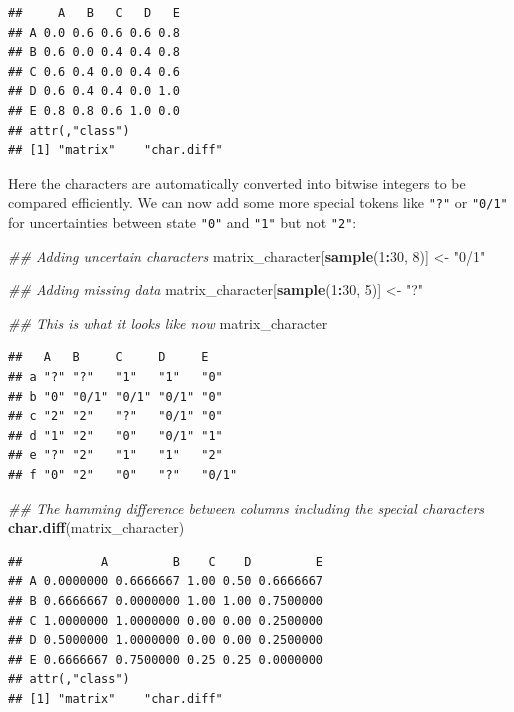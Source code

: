 \documentclass[
]{book}
\newenvironment{Shaded}{\begin{snugshade}}{\end{snugshade}}
\newcommand{\CommentTok}[1]{\textcolor[rgb]{0.56,0.35,0.01}{\textit{#1}}}
\newcommand{\DecValTok}[1]{\textcolor[rgb]{0.00,0.00,0.81}{#1}}
\newcommand{\KeywordTok}[1]{\textcolor[rgb]{0.13,0.29,0.53}{\textbf{#1}}}
\newcommand{\NormalTok}[1]{#1}
\newcommand{\OperatorTok}[1]{\textcolor[rgb]{0.81,0.36,0.00}{\textbf{#1}}}
\newcommand{\StringTok}[1]{\textcolor[rgb]{0.31,0.60,0.02}{#1}}
\begin{document}
\begin{verbatim}
##     A   B   C   D   E
## A 0.0 0.6 0.6 0.6 0.8
## B 0.6 0.0 0.4 0.4 0.8
## C 0.6 0.4 0.0 0.4 0.6
## D 0.6 0.4 0.4 0.0 1.0
## E 0.8 0.8 0.6 1.0 0.0
## attr(,"class")
## [1] "matrix"    "char.diff"
\end{verbatim}

Here the characters are automatically converted into bitwise integers to be compared efficiently. We can now add some more special tokens like \texttt{"?"} or \texttt{"0/1"} for uncertainties between state \texttt{"0"} and \texttt{"1"} but not \texttt{"2"}:

\begin{Shaded}
\begin{Highlighting}[]
\CommentTok{\#\# Adding uncertain characters}
\NormalTok{matrix\_character[}\KeywordTok{sample}\NormalTok{(}\DecValTok{1}\OperatorTok{:}\DecValTok{30}\NormalTok{, }\DecValTok{8}\NormalTok{)] \textless{}{-}}\StringTok{ "0/1"}

\CommentTok{\#\# Adding missing data}
\NormalTok{matrix\_character[}\KeywordTok{sample}\NormalTok{(}\DecValTok{1}\OperatorTok{:}\DecValTok{30}\NormalTok{, }\DecValTok{5}\NormalTok{)] \textless{}{-}}\StringTok{ "?"}

\CommentTok{\#\# This is what it looks like now}
\NormalTok{matrix\_character}
\end{Highlighting}
\end{Shaded}

\begin{verbatim}
##   A   B     C     D     E    
## a "?" "?"   "1"   "1"   "0"  
## b "0" "0/1" "0/1" "0/1" "0"  
## c "2" "2"   "?"   "0/1" "0"  
## d "1" "2"   "0"   "0/1" "1"  
## e "?" "2"   "1"   "1"   "2"  
## f "0" "2"   "0"   "?"   "0/1"
\end{verbatim}

\begin{Shaded}
\begin{Highlighting}[]
\CommentTok{\#\# The hamming difference between columns including the special characters}
\KeywordTok{char.diff}\NormalTok{(matrix\_character)}
\end{Highlighting}
\end{Shaded}

\begin{verbatim}
##           A         B    C    D         E
## A 0.0000000 0.6666667 1.00 0.50 0.6666667
## B 0.6666667 0.0000000 1.00 1.00 0.7500000
## C 1.0000000 1.0000000 0.00 0.00 0.2500000
## D 0.5000000 1.0000000 0.00 0.00 0.2500000
## E 0.6666667 0.7500000 0.25 0.25 0.0000000
## attr(,"class")
## [1] "matrix"    "char.diff"
\end{verbatim}
\end{document}
